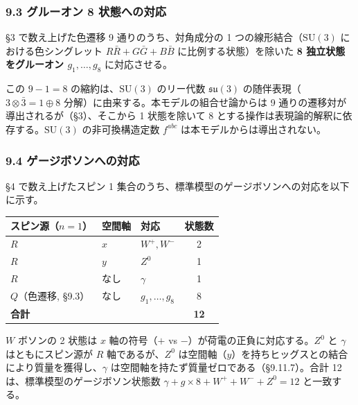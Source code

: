 \documentclass[
  a4paper,11pt]{ltjsarticle}
\newcounter{none}
\theoremstyle{definition}
\theoremstyle{remark}
\begin{document}
\subsubsection{9.3 グルーオン 8
状態への対応}\label{ux30b0ux30ebux30fcux30aaux30f3-8-ux72b6ux614bux3078ux306eux5bfeux5fdc}

§3 で数え上げた色遷移 9 通りのうち、対角成分の 1
つの線形結合（\(\mathrm{SU}(3)\) における色シングレット
\(R\bar{R} + G\bar{G} + B\bar{B}\) に比例する状態）を除いた \textbf{8
独立状態をグルーオン \(g_1, \ldots, g_8\)} に対応させる。

この \(9 - 1 = 8\) の縮約は、\(\mathrm{SU}(3)\) のリー代数
\(\mathfrak{su}(3)\) の随伴表現（\(3 \otimes \bar{3} = 1 \oplus 8\)
分解）に由来する。本モデルの組合せ論からは 9
通りの遷移対が導出されるが（§3）、そこから 1 状態を除いて 8
とする操作は表現論的解釈に依存する。\(\mathrm{SU}(3)\) の非可換構造定数
\(f^{abc}\) は本モデルからは導出されない。

\subsubsection{9.4
ゲージボソンへの対応}\label{ux30b2ux30fcux30b8ux30dcux30bdux30f3ux3078ux306eux5bfeux5fdc}

§4 で数え上げたスピン 1
集合のうち、標準模型のゲージボソンへの対応を以下に示す。

{\def\LTcaptype{none} %
\begin{longtable}[]{@{}lllc@{}}
\toprule\noalign{}
スピン源（\(n = 1\)） & 空間軸 & 対応 & 状態数 \\
\midrule\noalign{}
\endhead
\bottomrule\noalign{}
\endlastfoot
\(R\) & \(x\) & \(W^+, W^-\) & 2 \\
\(R\) & \(y\) & \(Z^0\) & 1 \\
\(R\) & なし & \(\gamma\) & 1 \\
\(Q\)（色遷移, §9.3） & なし & \(g_1, \ldots, g_8\) & 8 \\
\textbf{合計} & & & \textbf{12} \\
\end{longtable}
}

\(W\) ボソンの 2 状態は \(x\) 軸の符号（\(+\) vs
\(-\)）が荷電の正負に対応する。\(Z^0\) と \(\gamma\) はともにスピン源が
\(R\) 軸であるが、\(Z^0\)
は空間軸（\(y\)）を持ちヒッグスとの結合により質量を獲得し、\(\gamma\)
は空間軸を持たず質量ゼロである（§9.11.7）。合計 12
は、標準模型のゲージボソン状態数
\(\gamma + g \times 8 + W^+ + W^- + Z^0 = 12\) と一致する。
\end{document}
